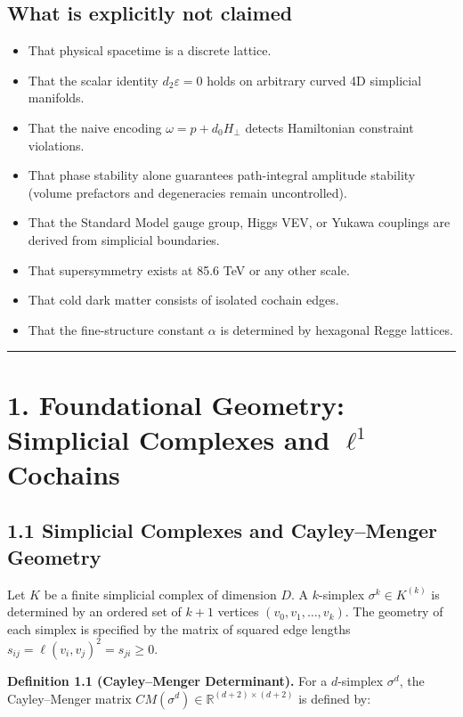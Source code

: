 \documentclass[11pt]{article}
\begin{document}
\subsection{\texorpdfstring{What is explicitly not claimed}{What is explicitly not claimed}}

\begin{itemize}[leftmargin=1.4em,itemsep=0.2em]
\item That physical spacetime is a discrete lattice.
\item That the scalar identity $d_2 \varepsilon = 0$ holds on arbitrary curved 4D simplicial manifolds.
\item That the naive encoding $\omega = p + d_0 H_\perp$ detects Hamiltonian constraint violations.
\item That phase stability alone guarantees path-integral amplitude stability (volume prefactors and degeneracies remain uncontrolled).
\item That the Standard Model gauge group, Higgs VEV, or Yukawa couplings are derived from simplicial boundaries.
\item That supersymmetry exists at 85.6 TeV or any other scale.
\item That cold dark matter consists of isolated cochain edges.
\item That the fine-structure constant $\alpha$ is determined by hexagonal Regge lattices.
\end{itemize}
\medskip\hrule\medskip
\section{\texorpdfstring{1. Foundational Geometry: Simplicial Complexes and $\ell^1$ Cochains}{1. Foundational Geometry: Simplicial Complexes and ℓ¹ Cochains}}

\subsection{\texorpdfstring{1.1 Simplicial Complexes and Cayley--Menger Geometry}{1.1 Simplicial Complexes and Cayley--Menger Geometry}}

Let $K$ be a finite simplicial complex of dimension $D$. A $k$-simplex $\sigma^k \in K^{(k)}$ is determined by an ordered set of $k+1$ vertices $(v_0, v_1, \dots, v_k)$. The geometry of each simplex is specified by the matrix of squared edge lengths $s_{ij} = \ell(v_i, v_j)^2 = s_{ji} \ge 0$.

\textbf{Definition 1.1 (Cayley--Menger Determinant).} For a $d$-simplex $\sigma^d$, the Cayley--Menger matrix $CM(\sigma^d) \in \mathbb{R}^{(d+2) \times (d+2)}$ is defined by:
\end{document}
